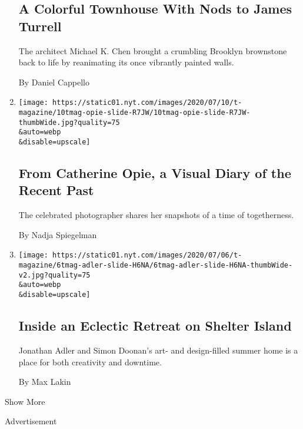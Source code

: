 \begin{enumerate}
  \hypertarget{a-colorful-townhouse-with-nods-to-james-turrell}{%
  \subsection{A Colorful Townhouse With Nods to James
  Turrell}\label{a-colorful-townhouse-with-nods-to-james-turrell}}

  The architect Michael K. Chen brought a crumbling Brooklyn brownstone
  back to life by reanimating its once vibrantly painted walls.

  By Daniel Cappello
\item
  \href{/2020/07/10/t-magazine/catherine-opie-photos.html}{}

  \texttt{[image: https://static01.nyt.com/images/2020/07/10/t-magazine/10tmag-opie-slide-R7JW/10tmag-opie-slide-R7JW-thumbWide.jpg?quality=75\\\&auto=webp\\\&disable=upscale]}

  \hypertarget{from-catherine-opie-a-visual-diary-of-the-recent-past}{%
  \subsection{From Catherine Opie, a Visual Diary of the Recent
  Past}\label{from-catherine-opie-a-visual-diary-of-the-recent-past}}

  The celebrated photographer shares her snapshots of a time of
  togetherness.

  By Nadja Spiegelman
\item
  \href{/2020/07/10/t-magazine/jonathan-adler-simon-doonan-home.html}{}

  \texttt{[image: https://static01.nyt.com/images/2020/07/06/t-magazine/6tmag-adler-slide-H6NA/6tmag-adler-slide-H6NA-thumbWide-v2.jpg?quality=75\\\&auto=webp\\\&disable=upscale]}

  \hypertarget{inside-an-eclectic-retreat-on-shelter-island}{%
  \subsection{Inside an Eclectic Retreat on Shelter
  Island}\label{inside-an-eclectic-retreat-on-shelter-island}}

  Jonathan Adler and Simon Doonan's art- and design-filled summer home
  is a place for both creativity and downtime.

  By Max Lakin
\end{enumerate}

Show More

Advertisement

